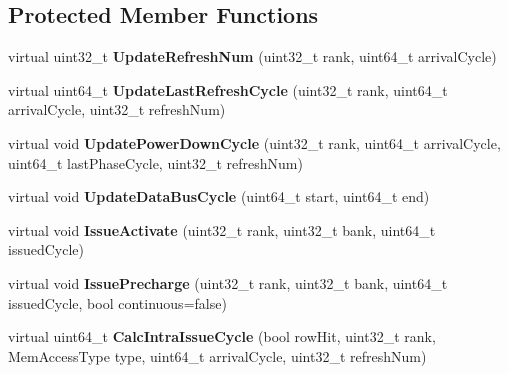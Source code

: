 \subsection*{Protected Member Functions}
\begin{DoxyCompactItemize}
\item 
\hypertarget{classMemChannelBase_afcd52ed68d557269656f7a924439d8da}{virtual uint32\-\_\-t {\bfseries Update\-Refresh\-Num} (uint32\-\_\-t rank, uint64\-\_\-t arrival\-Cycle)}\label{classMemChannelBase_afcd52ed68d557269656f7a924439d8da}

\item 
\hypertarget{classMemChannelBase_afe808ac3c91971d3ca2c6abc102a74b4}{virtual uint64\-\_\-t {\bfseries Update\-Last\-Refresh\-Cycle} (uint32\-\_\-t rank, uint64\-\_\-t arrival\-Cycle, uint32\-\_\-t refresh\-Num)}\label{classMemChannelBase_afe808ac3c91971d3ca2c6abc102a74b4}

\item 
\hypertarget{classMemChannelBase_afb623d60de5b36bebb39d9e21827f6e8}{virtual void {\bfseries Update\-Power\-Down\-Cycle} (uint32\-\_\-t rank, uint64\-\_\-t arrival\-Cycle, uint64\-\_\-t last\-Phase\-Cycle, uint32\-\_\-t refresh\-Num)}\label{classMemChannelBase_afb623d60de5b36bebb39d9e21827f6e8}

\item 
\hypertarget{classMemChannelBase_aeb0400d262f6c664792449f8253e05ba}{virtual void {\bfseries Update\-Data\-Bus\-Cycle} (uint64\-\_\-t start, uint64\-\_\-t end)}\label{classMemChannelBase_aeb0400d262f6c664792449f8253e05ba}

\item 
\hypertarget{classMemChannelBase_ac93aad272161b449246548a4e273431d}{virtual void {\bfseries Issue\-Activate} (uint32\-\_\-t rank, uint32\-\_\-t bank, uint64\-\_\-t issued\-Cycle)}\label{classMemChannelBase_ac93aad272161b449246548a4e273431d}

\item 
\hypertarget{classMemChannelBase_af92d30734305756e52a9b2e2b2b6bf0c}{virtual void {\bfseries Issue\-Precharge} (uint32\-\_\-t rank, uint32\-\_\-t bank, uint64\-\_\-t issued\-Cycle, bool continuous=false)}\label{classMemChannelBase_af92d30734305756e52a9b2e2b2b6bf0c}

\item 
\hypertarget{classMemChannelBase_afb3cbd4a7c94e0e864405e400b89d4b1}{virtual uint64\-\_\-t {\bfseries Calc\-Intra\-Issue\-Cycle} (bool row\-Hit, uint32\-\_\-t rank, Mem\-Access\-Type type, uint64\-\_\-t arrival\-Cycle, uint32\-\_\-t refresh\-Num)}\label{classMemChannelBase_afb3cbd4a7c94e0e864405e400b89d4b1}


\end{DoxyCompactItemize}
